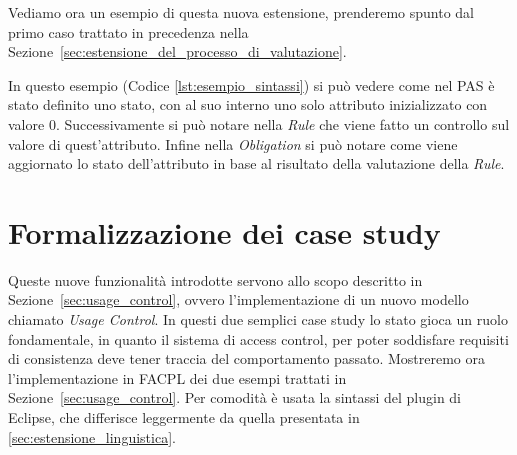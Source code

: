 Vediamo ora un esempio di questa nuova estensione, prenderemo spunto dal primo caso trattato in precedenza nella Sezione~\ref{sec:estensione_del_processo_di_valutazione}.

In questo esempio (Codice \ref{lst:esempio_sintassi}) si può vedere come nel PAS è stato definito uno stato, con al suo interno uno solo attributo inizializzato con valore $0$.
Successivamente si può notare nella \textit{Rule} che viene fatto un controllo sul valore di quest'attributo.
Infine nella \textit{Obligation} si può notare come viene aggiornato lo stato dell'attributo in base al risultato della valutazione della \textit{Rule}.

\section{Formalizzazione dei case study} %
\label{sec:esempi}

Queste nuove funzionalità introdotte servono allo scopo descritto in Sezione~\ref{sec:usage_control}, ovvero l'implementazione di un nuovo modello chiamato \textit{Usage Control}.
In questi due semplici case study lo stato gioca un ruolo fondamentale, in quanto il sistema di access control, per poter soddisfare requisiti di consistenza deve tener traccia del comportamento passato.
Mostreremo ora l'implementazione in \ac{FACPL} dei due esempi trattati in Sezione~\ref{sec:usage_control}. Per comodità è usata la sintassi del plugin di Eclipse, che differisce leggermente da quella presentata in \ref{sec:estensione_linguistica}. 

